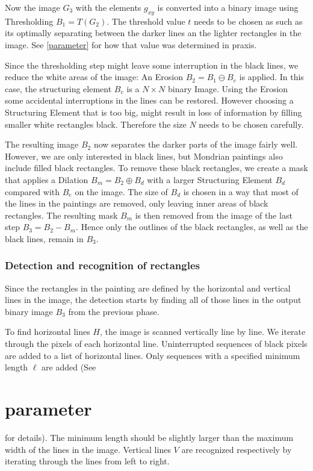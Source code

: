 \documentclass[serif,article,noparskip]{agse-thesis}
\begin{document}
Now the image $G_3$ with the elements $g_{xy}$ is converted into a binary image
using Thresholding $B_1 = T(G_2)$. The threshold value $t$ needs to be chosen
as such as its optimally separating between the darker lines an the lighter
rectangles in the image. See \ref{parameter} for how that value was determined
in praxis.

Since the thresholding step might leave some interruption in the black lines, we
reduce the white areas of the image: An Erosion $B_2 = B_1 \ominus B_e$ is
applied. In this case, the structuring element $B_e$ is a $N\times N$ binary
Image. Using the Erosion some accidental interruptions in the lines can be
restored. However choosing a Structuring Element that is too big, might
result in loss of information by filling smaller white rectangles black.
Therefore the size $N$ needs to be chosen carefully.

The resulting image $B_2$ now separates the darker parts of the image fairly
well. However, we are only interested in black lines, but Mondrian paintings
also include filled black rectangles. To remove these black rectangles, we
create a mask that applies a Dilation $B_m = B_2 \oplus B_d$ with a larger
Structuring Element $B_d$ compared with $B_e$ on the image. The size of $B_d$ is
chosen in a way that most of the lines in the paintings are removed, only
leaving inner areas of black rectangles. The resulting mask $B_m$ is then
removed from the image of the last step $B_3 = B_2 - B_m$. Hence only the
outlines of the black rectangles, as well as the black lines, remain in $B_3$.

\subsubsection{Detection and recognition of rectangles} \label{rectangles}

Since the rectangles in the painting are defined by the horizontal and
vertical lines in the image, the detection starts by finding all of those lines
in the output binary image $B_3$ from the previous phase.


To find horizontal lines $H$, the image is scanned vertically line by line. We
iterate through the pixels of each horizontal line. Uninterrupted sequences of
black pixels are added to a list of horizontal lines. Only sequences with a
specified minimum length $\ell$ are added (See \section{parameter} for details).
The minimum length should be slightly larger than the maximum width of the lines
in the image. Vertical lines $V$ are recognized respectively by iterating
through the lines from left to right.
\end{document}
